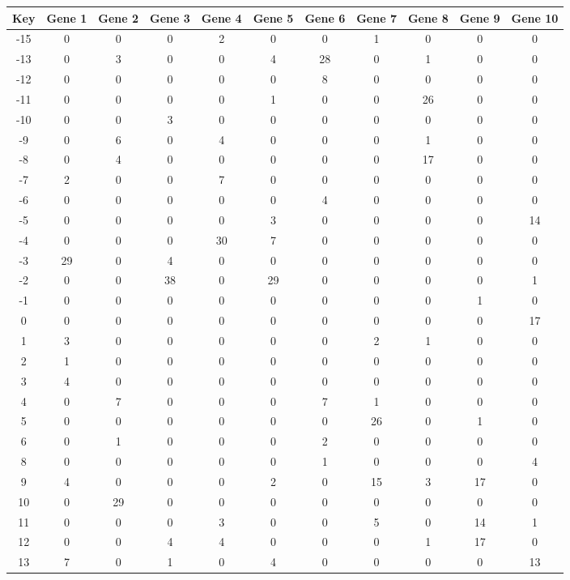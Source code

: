 \begin{tabular}{|c|c|c|c|c|c|c|c|c|c|c|}
\hline
Key & Gene 1 & Gene 2 & Gene 3 & Gene 4 & Gene 5 & Gene 6 & Gene 7 & Gene 8 & Gene 9 & Gene 10 \\
\hline
-15 & 0 & 0 & 0 & 2 & 0 & 0 & 1 & 0 & 0 & 0 \\
-13 & 0 & 3 & 0 & 0 & 4 & 28 & 0 & 1 & 0 & 0 \\
-12 & 0 & 0 & 0 & 0 & 0 & 8 & 0 & 0 & 0 & 0 \\
-11 & 0 & 0 & 0 & 0 & 1 & 0 & 0 & 26 & 0 & 0 \\
-10 & 0 & 0 & 3 & 0 & 0 & 0 & 0 & 0 & 0 & 0 \\
-9 & 0 & 6 & 0 & 4 & 0 & 0 & 0 & 1 & 0 & 0 \\
-8 & 0 & 4 & 0 & 0 & 0 & 0 & 0 & 17 & 0 & 0 \\
-7 & 2 & 0 & 0 & 7 & 0 & 0 & 0 & 0 & 0 & 0 \\
-6 & 0 & 0 & 0 & 0 & 0 & 4 & 0 & 0 & 0 & 0 \\
-5 & 0 & 0 & 0 & 0 & 3 & 0 & 0 & 0 & 0 & 14 \\
-4 & 0 & 0 & 0 & 30 & 7 & 0 & 0 & 0 & 0 & 0 \\
-3 & 29 & 0 & 4 & 0 & 0 & 0 & 0 & 0 & 0 & 0 \\
-2 & 0 & 0 & 38 & 0 & 29 & 0 & 0 & 0 & 0 & 1 \\
-1 & 0 & 0 & 0 & 0 & 0 & 0 & 0 & 0 & 1 & 0 \\
0 & 0 & 0 & 0 & 0 & 0 & 0 & 0 & 0 & 0 & 17 \\
1 & 3 & 0 & 0 & 0 & 0 & 0 & 2 & 1 & 0 & 0 \\
2 & 1 & 0 & 0 & 0 & 0 & 0 & 0 & 0 & 0 & 0 \\
3 & 4 & 0 & 0 & 0 & 0 & 0 & 0 & 0 & 0 & 0 \\
4 & 0 & 7 & 0 & 0 & 0 & 7 & 1 & 0 & 0 & 0 \\
5 & 0 & 0 & 0 & 0 & 0 & 0 & 26 & 0 & 1 & 0 \\
6 & 0 & 1 & 0 & 0 & 0 & 2 & 0 & 0 & 0 & 0 \\
8 & 0 & 0 & 0 & 0 & 0 & 1 & 0 & 0 & 0 & 4 \\
9 & 4 & 0 & 0 & 0 & 2 & 0 & 15 & 3 & 17 & 0 \\
10 & 0 & 29 & 0 & 0 & 0 & 0 & 0 & 0 & 0 & 0 \\
11 & 0 & 0 & 0 & 3 & 0 & 0 & 5 & 0 & 14 & 1 \\
12 & 0 & 0 & 4 & 4 & 0 & 0 & 0 & 1 & 17 & 0 \\
13 & 7 & 0 & 1 & 0 & 4 & 0 & 0 & 0 & 0 & 13 \\
\hline
\end{tabular}